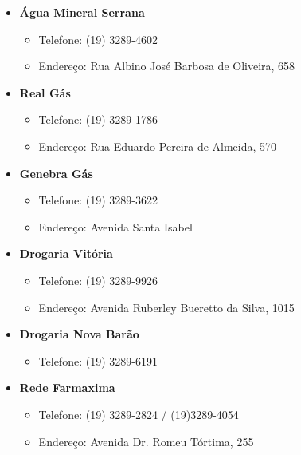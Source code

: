 \begin{itemize}
\item  \textbf{Água Mineral Serrana}
\begin{itemize}
\item  Telefone: (19) 3289-4602
\item  Endereço: Rua Albino José Barbosa de Oliveira, 658
\end{itemize}
\end{itemize}

\begin{itemize}
\item  \textbf{Real Gás}
\begin{itemize}
\item  Telefone: (19) 3289-1786
\item  Endereço: Rua Eduardo Pereira de Almeida, 570
\end{itemize}
\end{itemize}

\begin{itemize}
\item  \textbf{Genebra Gás}
\begin{itemize}
\item  Telefone: (19) 3289-3622
\item  Endereço: Avenida Santa Isabel
\end{itemize}
\end{itemize}

\begin{itemize}
\item  \textbf{Drogaria Vitória}
\begin{itemize}
\item  Telefone: (19) 3289-9926
\item  Endereço: Avenida Ruberley Bueretto da Silva, 1015
\end{itemize}
\end{itemize}

\begin{itemize}
\item  \textbf{Drogaria Nova Barão}
\begin{itemize}
\item  Telefone: (19) 3289-6191
\end{itemize}
\end{itemize}

\begin{itemize}
\item  \textbf{Rede Farmaxima}
\begin{itemize}
\item  Telefone: (19) 3289-2824 / (19)3289-4054
\item  Endereço: Avenida Dr. Romeu Tórtima, 255
\end{itemize}
\end{itemize}

